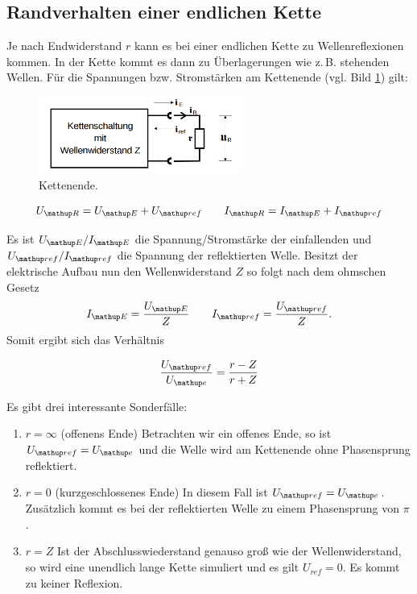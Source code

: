 \subsection{Randverhalten einer endlichen Kette}
Je nach Endwiderstand $r$ kann es bei einer endlichen Kette
zu Wellenreflexionen kommen. In der Kette kommt es dann %
zu Überlagerungen wie z.\,B. stehenden Wellen. %
Für die Spannungen bzw. Stromstärken am Kettenende (vgl. Bild \ref{fig:kettenende}) gilt:%

\begin{figure}
  \centering
  \includegraphics[width=0.6\textwidth]{bilder/wellenwiderstand.png}
  \caption{Kettenende.\cite{anleitung356}}
  \label{fig:kettenende}
\end{figure}

\begin{equation*}
U\ua{R}=U\ua{E}+U\ua{ref} \qquad I\ua{R}=I\ua{E}+I\ua{ref}
\end{equation*}

Es ist $U\ua{E}/I\ua{E}$ die Spannung/Stromstärke der einfallenden und $U\ua{ref}/I\ua{ref}$ die Spannung der reflektierten
Welle. Besitzt der elektrische Aufbau nun den Wellenwiderstand $Z$ so folgt nach dem
ohmschen Gesetz
\begin{equation*}
I\ua{E}=\frac{U\ua{E}}{Z} \qquad I\ua{ref}=\frac{U\ua{ref}}{Z}.
\end{equation*}
Somit ergibt sich das Verhältnis

\begin{equation*}
\frac{U\ua{ref}}{U\ua{e}}=\frac{r-Z}{r+Z}
\end{equation*}

Es gibt drei interessante Sonderfälle:

\renewcommand{\labelenumi}{\alph{enumi})}
\begin{enumerate}
\item{ $r=\infty$ (offenens Ende) \newline
Betrachten wir ein offenes Ende, so ist $U\ua{ref}=U\ua{e}$ und die Welle wird am Kettenende ohne Phasensprung reflektiert.} %
\item{ $r=0$ (kurzgeschlossenes Ende) \newline
In diesem Fall ist $U\ua{ref}=U\ua{e}$. Zusätzlich kommt es bei der reflektierten Welle zu einem Phasensprung von $\pi$.} %
\item{ $r=Z$ \newline
Ist der Abschlusswiederstand genauso groß wie der Wellenwiderstand, so wird eine unendlich lange Kette simuliert und
es gilt $U_{ref}=0$. Es kommt zu keiner Reflexion.}
\end{enumerate}

